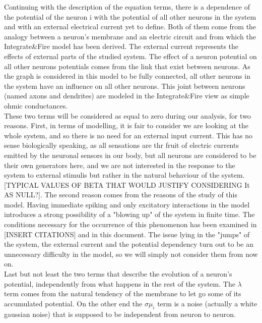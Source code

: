 	Continuing with the description of the equation terms, there is a dependence of the potential of the neuron i with the potential of all other neurons in the system and with an external electrical current yet to define. Both of them come from the analogy between a neuron's membrane and an electric circuit and from which the Integrate\&Fire model has been derived. The external current represents the effects of external parts of the studied system. The effect of a neuron potential on all other neurons potentials comes from the link that exist between neurons. As the graph is considered in this model to be fully connected, all other neurons in the system have an influence on all other neurons. This joint between neurons (named axons and dendrites) are modeled in the Integrate\&Fire view as simple ohmic conductances.\\
	These two terms will be considered as equal to zero during our analysis, for two reasons. First, in terms of modelling, it is fair to consider we are looking at the whole system, and so there is no need for an external input current. This has no sense biologically speaking, as all sensations are thr fruit of electric currents emitted by the neuronal sensors in our body, but all neurons are considered to be their own generators here, and we are not interested in the response to the system to external stimulis but rather in the natural behaviour of the system. [TYPICAL VALUES OF BETA THAT WOULD JUSTIFY CONSIDERING It AS NULL?]. The second reason comes from the reasons of the study of this model. Having immediate spiking and only excitatory interactions in the model introduces a strong possibility of a "blowing up" of the system in finite time. The conditions necessary for the occurrence of this phenomenon has been examined in [INSERT CITATIONS] and in this document. The issue lying in the "jumps" of the system, the external current and the potential dependency turn out to be an unnecessary difficulty in the model, so we will simply not consider them from now on.\\

	Last but not least the two terms that describe the evolution of a neuron's potential, independently from what happens in the rest of the system. The $\lambda$ term comes from the natural tendency of the membrane to let go some of its accumulated potential. On the other end the $\sigma\mu_i$ term is a noise (actually a white gaussian noise) that is supposed to be independent from neuron to neuron.\\
